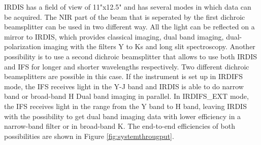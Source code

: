 \documentclass[twoside,single]{lion-msc}
\begin{document}
IRDIS has a field of view of 11"x12.5" and has several modes in which data can be acquired. The NIR part of the beam that is seperated by the first dichroic beamsplitter can be used in two different way. All the light can be reflected on a mirror to IRDIS, which provides classical imaging, dual band imaging, dual-polarization imaging with the filters Y to Ks and long slit spectroscopy. Another possibility is to use a second dichroic beamsplitter that allows to use both IRDIS and IFS for longer and shorter wavelengths respectively. Two different dichroic beamsplitters are possible in this case. If the instrument is set up in IRDIFS mode, the IFS receives light in the Y-J band and IRDIS is able to do narrow band or broad-band H Dual band imaging in parallel. In IRDIFS\_EXT mode, the IFS receives light in the range from the Y band to H band, leaving IRDIS with the possibility to get dual band imaging data with lower efficiency in a narrow-band filter or in broad-band K. The end-to-end efficiencies of both possibilities are shown in Figure \ref{fig:systemthrougput}. 
\end{document}
